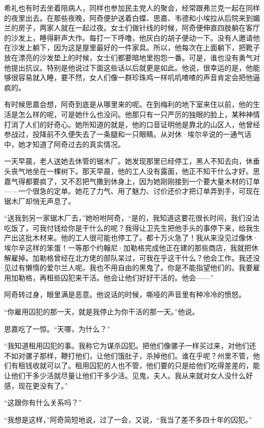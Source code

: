 \par 希礼也有时去坐着陪病人，同样也参加民主党人的聚会，经常跟弗兰克一起在同样的夜里出去。在那些夜晚，阿奇便护送着白蝶、思嘉、韦德和小埃拉从后院来到媚兰的房子，两家人就在一起过夜。女士们做针线的时候，阿奇便伸直四肢躺在客厅的沙发上，睡得鼾声大作。每打一下呼噜，他灰白的胡子便动一下。没有人邀请他在沙发上躺下，因为这是屋里最好的一件家具。所以，他每次在上面躺下，把靴子放在漂亮的沙发垫上的时候，女士们都要暗地里抱怨一番。可是，谁也没有勇气对他提出抗议。特别是他说过下面这些话以后就更是如此。他说，很幸运的是，他能够很容易就入睡，要不然，女人们像一群珍珠鸡一样叽叽喳喳的声音肯定会把他逼疯的。
\par 有时候思嘉会想，阿奇到底是从哪里来的呢。在到梅利的地下室来住以前，他的生活是怎么样的呢，可是她什么也没问。他那只有一只严厉的独眼的脸上，某种神情打消了人们的好奇心。她所知道的就是，他的口音证明他是靠北的山区人，他曾经参战过，投降前不久便失去了一条腿和一只眼睛。从对休·埃尔辛说的一通气话中，她才知道了阿奇过去的真实情况。
\par 一天早晨，老人送她去休管的锯木厂。她发现那里已经停工，黑人不知去向，休垂头丧气地坐在一棵树下。那天早晨，他的工人没有露面，他正不知干什么才好。思嘉气得都要疯了，又不忍把气撒到休身上，因为她刚刚接到一个要大量木材的订单——一个很急的定单。她花了力气、用了魅力、讨价还价才把订单弄到手，可现在锯木厂却悄无声息了。
\par “送我到另一家锯木厂去，”她吩咐阿奇，“是的，我知道这要花很长时间，我们没法吃饭了，可我付钱给你是干什么的呢？我得让卫先生把他手头的事停下来，给我生产出这批木材来。他的工人很可能也停工了。都十万火急了！我从来没见过像休·埃尔辛这样的笨蛋！一等那个约翰尼·加勒格完成他正在建的那些商店，我就把休解雇掉。加勒格曾经在北方佬的部队呆过，可我在乎这干什么？他会工作。我还没见过有懒惰的爱尔兰人呢。我也不用自由的黑鬼了。你是不能指望他们的。我要雇用加勒格，再租些囚犯来干活。他会让他们好好干活的。他会——”
\par 阿奇转过身，眼里满是恶意。他说话的时候，嘶哑的声音里有种冷冷的愤怒。
\par “你雇用囚犯的那一天，就是我停止为你干活的那一天。”他说。
\par 思嘉吃了一惊。“天哪，为什么？”
\par “我知道租用囚犯的事。我称它为谋杀囚犯。把他们像骡子一样买过来，对他们还不如对骡子那样，鞭打他们，让他们饿肚子，杀掉他们。谁在乎呢？州里不管，他们有租钱收就可以了。租用囚犯的人也不管，他们要的只是给他们吃得差差的，能让他们干多少活就尽量让他们干多少活。见鬼，夫人。我从来就对女人没什么好感，现在更没有了。”
\par “这跟你有什么关系吗？”
\par “我想是这样，”阿奇简短地说，过了一会，又说，“我当了差不多四十年的囚犯。”
